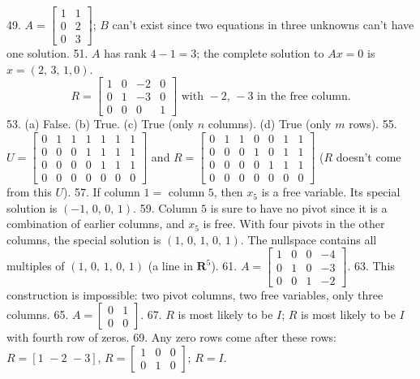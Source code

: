 49. \(A=\begin{bmatrix}1&1\\ 0&2\\ 0&3\end{bmatrix}\); \(B\) can't exist since two equations in three unknowns can't have one solution.
51. \(A\) has rank \(4-1=3\); the complete solution to \(Ax=0\) is \(x=(2,\,3,\,1,0)\). \[R=\left[\begin{array}{rrrr}1&0&-2&0\\ 0&1&-3&0\\ 0&0&0&1\end{array}\right]\text{ with }-2,\,-3\text{ in the free column.}\]
53. (a) False. (b) True. (c) True (only \(n\) columns). (d) True (only \(m\) rows).
55. \(U=\begin{bmatrix}0&1&1&1&1&1&1\\ 0&0&0&1&1&1&1\\ 0&0&0&0&1&1&1\\ 0&0&0&0&0&0&0\end{bmatrix}\) and \(R=\begin{bmatrix}0&1&1&0&0&1&1\\ 0&0&0&1&0&1&1\\ 0&0&0&0&1&1&1\\ 0&0&0&0&0&0&0\end{bmatrix}\) (\(R\) doesn't come from this \(U\)).
57. If column \(1=\) column \(5\), then \(x_{5}\) is a free variable. Its special solution is \((-1,\,0,\,0,\,1)\).
59. Column \(5\) is sure to have no pivot since it is a combination of earlier columns, and \(x_{5}\) is free. With four pivots in the other columns, the special solution is \((1,\,0,\,1,\,0,\,1)\). The nullspace contains all multiples of \((1,\,0,\,1,\,0,\,1)\) (a line in \(\mathbf{R}^{5}\)).
61. \(A=\begin{bmatrix}1&0&0&-4\\ 0&1&0&-3\\ 0&0&1&-2\end{bmatrix}\).
63. This construction is impossible: two pivot columns, two free variables, only three columns.
65. \(A=\begin{bmatrix}0&1\\ 0&0\end{bmatrix}\).
67. \(R\) is most likely to be \(I\); \(R\) is most likely to be \(I\) with fourth row of zeros.
69. Any zero rows come after these rows: \(R=[1\,\,-2\,\,-3]\), \(R=\begin{bmatrix}1&0&0\\ 0&1&0\end{bmatrix}\); \(R=I\).

